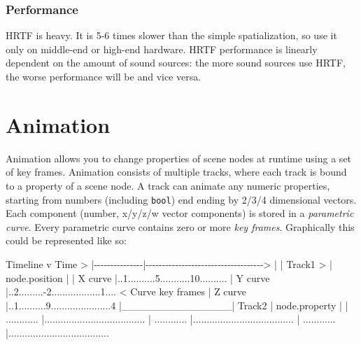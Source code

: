\documentclass[
]{book}
\newenvironment{Shaded}{\begin{snugshade}}{\end{snugshade}}
\newcommand{\NormalTok}[1]{#1}
\theoremstyle{definition}
\theoremstyle{definition}
\theoremstyle{definition}
\theoremstyle{definition}
\theoremstyle{remark}
\begin{document}
\subsection{Performance}\label{performance-8}

HRTF is heavy. It is 5-6 times slower than the simple spatialization, so use it only on middle-end or high-end hardware. HRTF performance is linearly dependent on the amount of sound sources: the more sound sources use HRTF, the worse performance will be and vice versa.

\chapter{Animation}\label{animation-4}

Animation allows you to change properties of scene nodes at runtime using a set of key frames. Animation consists of multiple tracks, where each track is bound to a property of a scene node. A track can animate any numeric properties, starting from numbers (including \texttt{bool}) end ending by 2/3/4 dimensional vectors. Each component (number, x/y/z/w vector components) is stored in a \emph{parametric curve}. Every parametric curve contains zero or more \emph{key frames}. Graphically this could be represented like so:

\begin{Shaded}
\begin{Highlighting}[]
\NormalTok{                                         Timeline}
\NormalTok{                                            v}
\NormalTok{  Time   \textgreater{} |{-}{-}{-}{-}{-}{-}{-}{-}{-}{-}{-}{-}{-}{-}{-}|{-}{-}{-}{-}{-}{-}{-}{-}{-}{-}{-}{-}{-}{-}{-}{-}{-}{-}{-}{-}{-}{-}{-}{-}{-}{-}{-}{-}{-}{-}{-}{-}{-}{-}{-}{-}\textgreater{}}
\NormalTok{           |               |}
\NormalTok{  Track1 \textgreater{} | node.position |                                     }
\NormalTok{           |   X curve     |..1..........5...........10..........}
\NormalTok{           |   Y curve     |..2.........{-}2..................1....  \textless{} Curve key frames}
\NormalTok{           |   Z curve     |..1..........9......................4}
\NormalTok{           |\_\_\_\_\_\_\_\_\_\_\_\_\_\_\_|  }
\NormalTok{  Track2   | node.property |                                  }
\NormalTok{           | ............  |.....................................}
\NormalTok{           | ............  |.....................................}
\NormalTok{           | ............  |.....................................}
\end{Highlighting}
\end{Shaded}
\end{document}
